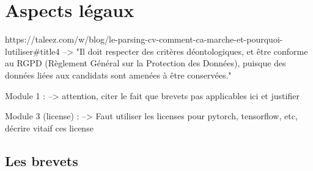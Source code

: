 \section{Aspects légaux}\label{section:aspects_legaux}

%
%


https://taleez.com/w/blog/le-parsing-cv-comment-ca-marche-et-pourquoi-lutiliser#title4
--> "Il doit respecter des critères déontologiques, et être conforme au RGPD (Règlement Général sur la Protection des Données), puisque des données liées aux candidats sont amenées à être conservées."

Module 1 : 
--> attention, citer le fait que brevets pas applicables ici et justifier


Module 3 (license) : 
--> Faut utiliser les licenses pour pytorch, tensorflow, etc, décrire vitaif ces license

\subsection{Les brevets}
 
